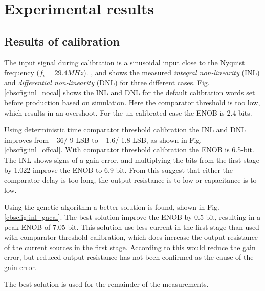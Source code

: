 \section{Experimental results}\label{cbscresults}

\subsection{Results of calibration}
The input signal during calibration is a sinusoidal input close to
the Nyquist frequency  ($f_i = 29.4MHz$).
{},  and 
 shows the measured \textit{integral non-linearity} (INL) and
\textit{differential non-linearity} (DNL) for three different cases. Fig.
\ref{cbscfig:inl_nocal} shows the INL and DNL for the default calibration
words set before production based on simulation. Here the
comparator threshold is too low, which results in an overshoot. For the un-calibrated
case the ENOB is 2.4-bits. 

Using deterministic time comparator
threshold calibration the INL and DNL
improves from +36/-9 LSB to +1.6/-1.8 LSB, as shown in Fig. \ref{cbscfig:inl_offcal}. With comparator
threshold calibration 
the ENOB is 6.5-bit. The INL shows signs of a gain error, and
multiplying the bits from the first stage by 1.022 improve the ENOB to
6.9-bit. From  this suggest that either the comparator
delay is too long, the output resistance is to  low or capacitance
is to low.

 Using the genetic 
algorithm a better solution is found, shown in
Fig. \ref{cbscfig:inl_gacal}. The best solution improve the ENOB by
0.5-bit, resulting in a peak ENOB of 7.05-bit. This solution use less
current in the first stage than used with comparator threshold
calibration, which does increase the output resistance of 
the current sources in the first stage. According to  this would
reduce the gain error, but reduced
output resistance has not been confirmed as the cause of the gain
error.

The best solution is
used for the remainder of the measurements. 


